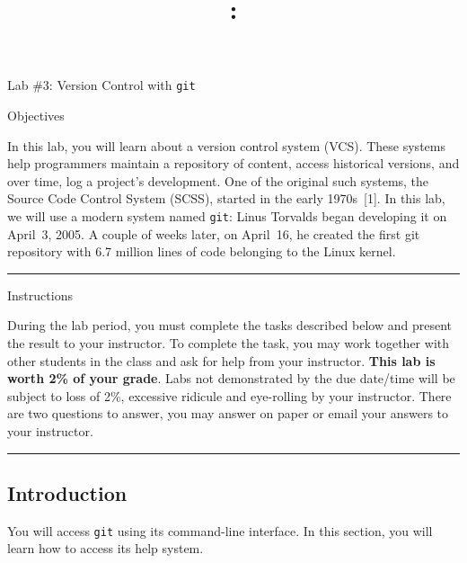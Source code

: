 \documentclass[letterpaper]{article}
\title{\course{}: \activity{}}
\date{}
\newcommand{\activity}{Lab \#3}
\newcommand{\horizrule}{\noindent\rule{\linewidth}{0.15mm}}
\begin{document}
\reversemarginpar

\begin{center}
  \Large{\activity{}: Version Control with {\tt git}}
\end{center}

\begin{center}
  \large{Objectives}
\end{center}

In this lab, you will learn about a version control system (VCS).
These systems help programmers maintain a repository of content, access historical versions, and over time, log a project's development.
One of the original such systems, the Source Code Control System (SCSS), started in the early 1970s~[1].
In this lab, we will use a modern system named {\tt git}: Linus Torvalds began developing it on April~3, 2005.
A couple of weeks later, on April~16, he created the first git repository with 6.7 million lines of code belonging to the Linux kernel.
\vspace{3mm}\\
\horizrule

\begin{center}
  \large{Instructions}
\end{center}

During the lab period, you must complete the tasks described below and present the result to your instructor.
To complete the task, you may work together with other students in the class and ask for help from your instructor.  {\bf This lab is worth 2\% of your grade}.
Labs not demonstrated by the due date/time will be subject to loss of 2\%, excessive ridicule
and eye-rolling by your instructor.   There are two questions to answer, you
may answer on paper or email your answers to your instructor.
\vspace{3mm}\\
\horizrule

\subsection*{Introduction}

You will access {\tt git} using its command-line interface.
In this section, you will learn how to access its help system.
\end{document}
